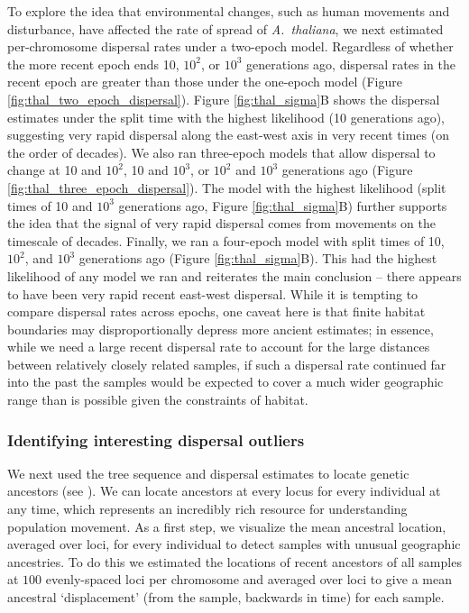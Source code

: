 \documentclass[12pt]{article}
\begin{document}
To explore the idea that environmental changes, such as human movements and disturbance, have affected the rate of spread of \textit{A.\ thaliana}, we next estimated per-chromosome dispersal rates under a two-epoch model.
Regardless of whether the more recent epoch ends 10, $10^2$, or $10^3$ generations ago, dispersal rates in the recent epoch are greater than those under the one-epoch model (Figure \ref{fig:thal_two_epoch_dispersal}). 
Figure \ref{fig:thal_sigma}B shows the dispersal estimates under the split time with the highest likelihood (10 generations ago), suggesting very rapid dispersal along the east-west axis in very recent times (on the order of decades).
We also ran three-epoch models that allow dispersal to change at 10 and $10^2$, 10 and $10^3$, or $10^2$ and $10^3$ generations ago (Figure \ref{fig:thal_three_epoch_dispersal}). 
The model with the highest likelihood (split times of 10 and $10^3$ generations ago, Figure \ref{fig:thal_sigma}B) further supports the idea that the signal of very rapid dispersal comes from movements on the timescale of decades. 
Finally, we ran a four-epoch model with split times of 10, $10^2$, and $10^3$ generations ago (Figure \ref{fig:thal_sigma}B).
This had the highest likelihood of any model we ran and reiterates the main conclusion -- there appears to have been very rapid recent east-west dispersal. 
While it is tempting to compare dispersal rates across epochs, one caveat here is that finite habitat boundaries may disproportionally depress more ancient estimates; in essence, while we need a large recent dispersal rate to account for the large distances between relatively closely related samples, if such a dispersal rate continued far into the past the samples would be expected to cover a much wider geographic range than is possible given the constraints of habitat.

\subsubsection*{Identifying interesting dispersal outliers}

We next used the tree sequence and dispersal estimates to locate genetic ancestors (see ).
We can locate ancestors at every locus for every individual at any time, which represents an incredibly rich resource for understanding population movement.
As a first step, we visualize the mean ancestral location, averaged over loci, for every individual to detect samples with unusual geographic ancestries.
To do this we estimated the locations of recent ancestors of all samples at $100$ evenly-spaced loci per chromosome and averaged over loci to give a mean ancestral `displacement' (from the sample, backwards in time) for each sample. 
\end{document}
